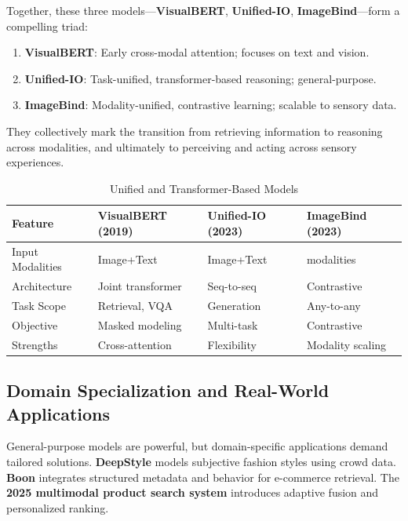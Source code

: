 \documentclass[conference]{IEEEtran}
\begin{document}
Together, these three models—\textbf{VisualBERT}, \textbf{Unified-IO}, \textbf{ImageBind}—form a compelling triad:

\begin{enumerate}
  \item \textbf{VisualBERT}: Early cross-modal attention; focuses on text and vision.
  \item \textbf{Unified-IO}: Task-unified, transformer-based reasoning; general-purpose.
  \item \textbf{ImageBind}: Modality-unified, contrastive learning; scalable to sensory data.
\end{enumerate}

They collectively mark the transition from retrieving information to reasoning across modalities, and ultimately to perceiving and acting across sensory experiences.

\begin{table}[ht]
\centering
\caption{Unified and Transformer-Based Models}
\label{tab:transformers}
\small
\setlength{\tabcolsep}{4pt}
\begin{tabularx}{\columnwidth}{@{}>{\raggedright\arraybackslash}X>{\raggedright\arraybackslash}X>{\raggedright\arraybackslash}X>{\raggedright\arraybackslash}X@{}}
\toprule
\textbf{Feature} & \textbf{VisualBERT (2019)} & \textbf{Unified-IO (2023)} & \textbf{ImageBind (2023)} \\
\midrule
Input Modalities & Image+Text & Image+Text & 6 modalities \\
Architecture & Joint transformer & Seq-to-seq & Contrastive \\
Task Scope & Retrieval, VQA & Generation & Any-to-any \\
Objective & Masked modeling & Multi-task & Contrastive \\
Strengths & Cross-attention & Flexibility & Modality scaling \\
\bottomrule
\end{tabularx}
\end{table}

\subsection{Domain Specialization and Real-World Applications}

General-purpose models are powerful, but domain-specific applications demand tailored solutions. \textbf{DeepStyle} models subjective fashion styles using crowd data. \textbf{Boon} integrates structured metadata and behavior for e-commerce retrieval. The \textbf{2025 multimodal product search system} introduces adaptive fusion and personalized ranking.
\end{document}
